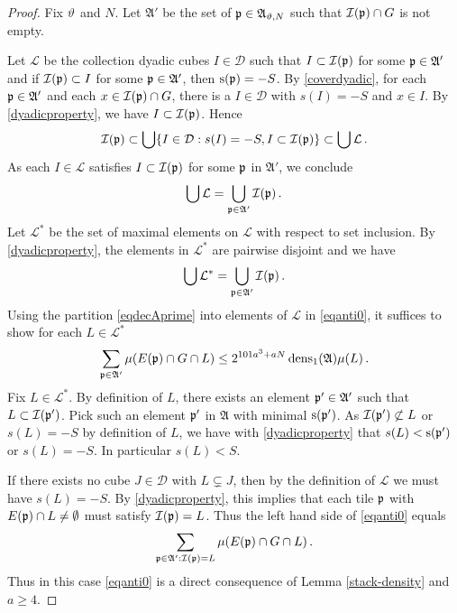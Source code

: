 {\begin{proof}
{Fix ${\vartheta}$ and $N$. Let
$\mathfrak{A}'$ be the set of ${\mathfrak p}\in\mathfrak{A}_{{\vartheta},N}$ such that ${\mathcal{I}}({\mathfrak p})\cap G$ is not empty.}


   Let $\mathcal{L}$ be the collection dyadic cubes $I\in\mathcal{D}$ such that $I\subset {\mathcal{I}}({\mathfrak p})$ for some ${\mathfrak p}\in\mathfrak{A}'$ and if ${\mathcal{I}}({\mathfrak p})\subset I$ for some ${\mathfrak p}\in\mathfrak{A}'$, then ${\mathrm{s}}({\mathfrak p})=-S$. By \eqref{coverdyadic}, for each ${\mathfrak p} \in \mathfrak{A}'$
   and each $x\in {\mathcal{I}}({\mathfrak p})\cap G$, there is a $I\in \mathcal{D}$ with $s(I)=-S$ and $x\in I$. By \eqref{dyadicproperty},
   we have $I\subset {\mathcal{I}}({\mathfrak p})$. Hence
   \begin{equation}
       {\mathcal{I}}({\mathfrak p})\subset \bigcup\{I\in \mathcal{D}: s(I)=-S, I\subset {\mathcal{I}}({\mathfrak p})\}\subset \bigcup \mathcal{L}\, .
   \end{equation}
As each $I\in \mathcal{L}$ satisfies $I\subset {\mathcal{I}}({\mathfrak p})$ for some ${\mathfrak p}$ in $\mathfrak{A'}$, we conclude
     \begin{equation}
\bigcup\mathcal{L}=\bigcup_{{\mathfrak p} \in \mathfrak{A}'}{\mathcal{I}}({\mathfrak p})\, .
   \end{equation}
Let $\mathcal{L}^*$ be the set of maximal elements on $\mathcal{L}$ with respect to set inclusion.
By \eqref{dyadicproperty}, the elements in $\mathcal{L}^*$ are pairwise disjoint and we have
 \begin{equation}\label{eqdecAprime}
\bigcup\mathcal{L}^*=\bigcup_{{\mathfrak p} \in \mathfrak{A}'}{\mathcal{I}}({\mathfrak p})\, .
   \end{equation}
Using the partition \eqref{eqdecAprime} into elements of $\mathcal{L}$ in \eqref{eqanti0}, it suffices to show for each $L\in \mathcal{L}^*$
\begin{equation}\label{eqanti0}
    \sum_{{\mathfrak p}\in\mathfrak{A}'}\mu(E({\mathfrak p})\cap G \cap L)
    \le
    2^{101a^3+aN}
    \operatorname{\operatorname{dens}}_1(\mathfrak{A})\mu(L)\,.
\end{equation}
Fix $L\in \mathcal{L}^*$.
By definition of $L$, there exists an element ${\mathfrak p}'\in \mathfrak{A}'$ such that $L\subset {\mathcal{I}}({\mathfrak p}')$. Pick such an element ${\mathfrak p}
'$
in $\mathfrak{A}$ with minimal ${\mathrm{s}}({\mathfrak p}')$. As ${\mathcal{I}}({\mathfrak p}')\not \subset L$ or $s(L) = -S$ by definition of $L$, we have
with \eqref{dyadicproperty} that $s(L)< {\mathrm{s}}({\mathfrak p}')$ or $s(L) = -S$. In particular $s(L)<S$.

If there exists no cube $J \in \mathcal{D}$ with $L \subsetneq J$, then by the definition of $\mathcal{L}$ we must have $s(L) = -S$. By \eqref{dyadicproperty}, this implies that each tile ${\mathfrak p}$ with $E({\mathfrak p}) \cap L \ne \emptyset$ must satisfy ${\mathcal{I}}({\mathfrak p}) = L$. Thus the left hand side of \eqref{eqanti0} equals
\begin{equation}
    \sum_{{\mathfrak p}\in\mathfrak{A}':{\mathcal{I}}({\mathfrak p})=L}\mu(E({\mathfrak p})\cap G\cap L)\,.
\end{equation}
Thus in this case \eqref{eqanti0} is a direct consequence of Lemma \ref{stack-density} and $a \ge 4$.


\end{proof}}
